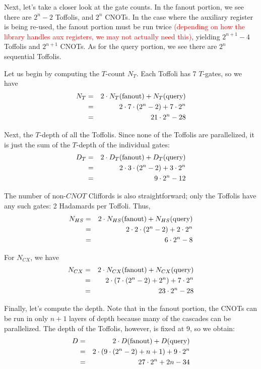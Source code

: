 \documentclass[a4paper,12pt]{article}
\newcommand\todo[1]{\textcolor{red}{#1}}
\begin{document}
Next, let's take a closer look at the gate counts. 
In the fanout portion, we see there are $2^n - 2$ Toffolis, and $2^n$ CNOTs. 
In the case where the auxiliary register is being re-used, the fanout portion must be run twice \todo{(depending on how the library handles aux registers, we may not actually need this)}, yielding $2^{n+1} - 4$ Toffolis and $2^{n+1}$ CNOTs. 
As for the query portion, we see there are $2^n$ sequential Toffolis.

Let us begin by computing the $T$-count $N_T$. 
Each Toffoli has 7 $T$-gates, so we have
\begin{eqnarray}
 \nonumber N_T &=& 2 \cdot N_T(\hbox{fanout}) + N_T(\hbox{query}) \\
 \nonumber    &=& 2 \cdot 7 \cdot (2^n - 2) + 7 \cdot 2^n \\
     &=& 21 \cdot 2^n - 28
\end{eqnarray}

Next, the $T$-depth of all the Toffolis. 
Since none of the Toffolis are parallelized, it is just the sum of the $T$-depth of the individual gates:
\begin{eqnarray}
 \nonumber D_T &=& 2 \cdot D_T(\hbox{fanout}) + D_T(\hbox{query}) \\
 \nonumber    &=& 2 \cdot 3 \cdot (2^n - 2) + 3 \cdot 2^n \\
     &=& 9 \cdot 2^n - 12
\end{eqnarray}

The number of non-$CNOT$ Cliffords is also straightforward; only the Toffolis have any such gates: 2 Hadamards per Toffoli. 
Thus,
\begin{eqnarray}
 \nonumber N_{HS} &=& 2 \cdot N_{HS}(\hbox{fanout}) + N_{HS}(\hbox{query}) \\
 \nonumber    &=& 2 \cdot 2 \cdot (2^n - 2) + 2 \cdot 2^n \\
     &=& 6 \cdot 2^n - 8
\end{eqnarray}

For $N_{CX}$, we have
\begin{eqnarray}
 \nonumber N_{CX} &=& 2 \cdot N_{CX}(\hbox{fanout}) + N_{CX}(\hbox{query}) \\
 \nonumber    &=& 2 \cdot \left(7 \cdot (2^n - 2) + 2^n \right)  + 7 \cdot 2^n \\
     &=& 23 \cdot 2^n - 28
\end{eqnarray}

Finally, let's compute the depth. 
Note that in the fanout portion, the CNOTs can be run in only $n + 1$ layers of depth because many of the cascades can be parallelized. 
The depth of the Toffolis, however, is fixed at 9, so we obtain:
\begin{eqnarray}
 \nonumber D &=& 2 \cdot D (\hbox{fanout}) + D (\hbox{query}) \\
 \nonumber    &=& 2 \cdot \left(9 \cdot (2^n - 2) +n + 1 \right) + 9 \cdot 2^n \\
     &=& 27 \cdot 2^n + 2n -34
\end{eqnarray}
\end{document}
